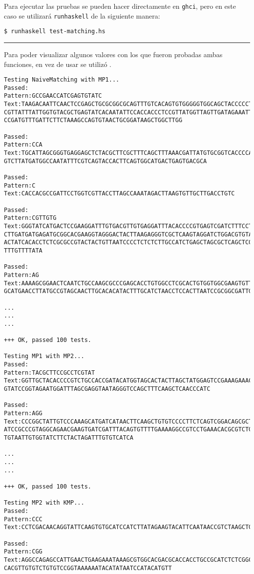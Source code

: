 Para ejecutar las pruebas se pueden hacer directamente en \texttt{ghci}, pero en este caso
se utilizará \texttt{runhaskell} de la siguiente manera:

\texttt{\$ runhaskell test-matching.hs}

\noindent\rule{\textwidth}{1pt}
Para poder visualizar algunos valores con los que fueron probadas ambas funciones, en vez de
usar  se utilizó .

\begin{verbatim}
Testing NaiveMatching with MP1...
Passed:
Pattern:GCCGAACCATCGAGTGTATC
Text:TAAGACAATTCAACTCCGAGCTGCGCGGCGCAGTTTGTCACAGTGTGGGGGTGGCAGCTACCCCCTAAG
CGTTATTTATTGGTGTACGCTGAGTATCACAATATTCCACCACCCTCCGTTATGGTTAGTTGATAGAAATTCGA
CCGATGTTTGATTCTTCTAAAGCCAGTGTAACTGCGGATAAGCTGGCTTGG

Passed:
Pattern:CCA
Text:TGCATTAGCGGGTGAGGAGCTCTACGCTTCGCTTTCAGCTTTAAACGATTATGTGCGGTCACCCCAATT
GTCTTATGATGGCCAATATTTCGTCAGTACCACTTCAGTGGCATGACTGAGTGACGCA

Passed:
Pattern:C
Text:CACCACGCCGATTCCTGGTCGTTACCTTAGCCAAATAGACTTAAGTGTTGCTTGACCTGTC

Passed:
Pattern:CGTTGTG
Text:GGGTATCATGACTCCGAAGGATTTGTGACGTTGTGAGGATTTACACCCCGTGAGTCGATCTTTCCTGGT
CTTGATGATGAGATGCGGCACGAAGGTAGGGACTACTTAAGAGGGTCGCTCAAGTAGGATCTGGACGTGTACAG
ACTATCACACCTCTCGCGCCGTACTACTGTTAATCCCCTCTCTCTTGCCATCTGAGCTAGCGCTCAGCTCGATA
TTTGTTTTATA

Passed:
Pattern:AG
Text:AAAAGCGGAACTCAATCTGCCAAGCGCCCGAGCACCTGTGGCCTCGCACTGTGGTGGCGAAGTGTTAAG
GCATGAACCTTATGCCGTAGCAACTTGCACACATACTTTGCATCTAACCTCCACTTAATCCGCGGCGATTGCAT

...
...
...

+++ OK, passed 100 tests.

Testing MP1 with MP2...
Passed:
Pattern:TACGCTTCCGCCTCGTAT
Text:GGTTGCTACACCCCGTCTGCCACCGATACATGGTAGCACTACTTAGCTATGGAGTCCGAAAGAAACCAG
GTATCCGGTAGAATGGATTTAGCGAGGTAATAGGGTCCAGCTTTCAAGCTCAACCCATC

Passed:
Pattern:AGG
Text:CCCGGCTATTGTCCCAAAGCATGATCATAACTTCAAGCTGTGTCCCCTTCTCAGTCGGACAGCGCTAGA
ATCCGCCCGTAGGCAGAACGAAGTGATCGATTTACAGTGTTTTGAAAAGGCCGTCCTGAAACACGCGTCTGTTA
TGTAATTGTGGTATCTTCTACTAGATTTGTGTCATCA

...
...
...

+++ OK, passed 100 tests.

Testing MP2 with KMP...
Passed:
Pattern:CCC
Text:CCTCGACAACAGGTATTCAAGTGTGCATCCATCTTATAGAAGTACATTCAATAACCGTCTAAGCTGCTG

Passed:
Pattern:CGG
Text:AGGCCAGAGCCATTGAACTGAAGAAATAAAGCGTGGCACGACGCACCACCTGCCGCATCTCTCGGCGCA
CACGTTGTGTCTGTGTCCGGTAAAAAATACATATAATCCATACATGTT


\end{verbatim}
